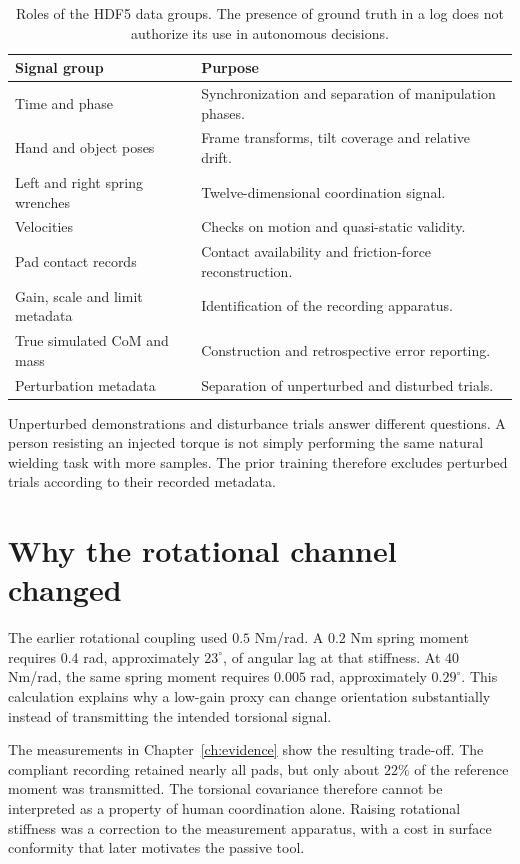 \begin{table}[htbp]\centering\small
\begin{tabular}{@{}lp{}@{}}\toprule
Signal group & Purpose \\\midrule
Time and phase & Synchronization and separation of manipulation phases.\\
Hand and object poses & Frame transforms, tilt coverage and relative drift.\\
Left and right spring wrenches & Twelve-dimensional coordination signal.\\
Velocities & Checks on motion and quasi-static validity.\\
Pad contact records & Contact availability and friction-force reconstruction.\\
Gain, scale and limit metadata & Identification of the recording apparatus.\\
True simulated CoM and mass & Construction and retrospective error reporting.\\
Perturbation metadata & Separation of unperturbed and disturbed trials.\\
\bottomrule\end{tabular}
\caption{Roles of the HDF5 data groups. The presence of ground truth in a log does not authorize its use in autonomous decisions.}
\label{tab:hdf5}
\end{table}

Unperturbed demonstrations and disturbance trials answer different questions. A person resisting an injected torque is not simply performing the same natural wielding task with more samples. The prior training therefore excludes perturbed trials according to their recorded metadata.

\section{Why the rotational channel changed}

The earlier rotational coupling used $0.5$ Nm/rad. A $0.2$ Nm spring moment requires $0.4$ rad, approximately $23^\circ$, of angular lag at that stiffness. At $40$ Nm/rad, the same spring moment requires $0.005$ rad, approximately $0.29^\circ$. This calculation explains why a low-gain proxy can change orientation substantially instead of transmitting the intended torsional signal.

The measurements in Chapter~\ref{ch:evidence} show the resulting trade-off. The compliant recording retained nearly all pads, but only about $22\%$ of the reference moment was transmitted. The torsional covariance therefore cannot be interpreted as a property of human coordination alone. Raising rotational stiffness was a correction to the measurement apparatus, with a cost in surface conformity that later motivates the passive tool.

